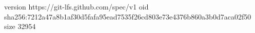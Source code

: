 version https://git-lfs.github.com/spec/v1
oid sha256:7212a47a8b1af30d5fafa95ead7535f26cd803e73e4376b860a3b0d7aca02f50
size 32954
